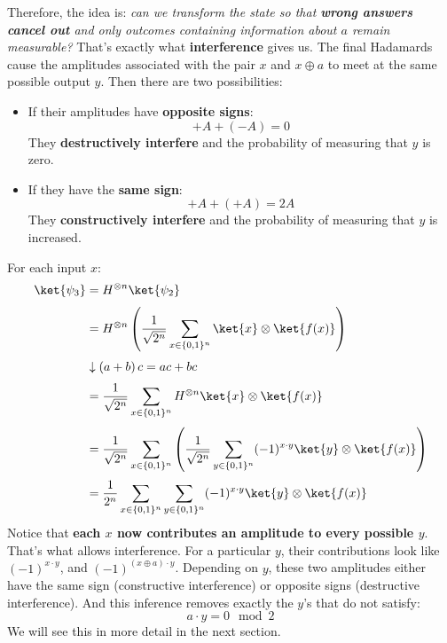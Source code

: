 \highspace
Therefore, the idea is: \emph{can we transform the state so that \textbf{wrong answers cancel out} and only outcomes containing information about $a$ remain measurable?} That's exactly what \textbf{interference} gives us. The final Hadamards cause the amplitudes associated with the pair $x$ and $x \oplus a$ to meet at the same possible output $y$. Then there are two possibilities:
\begin{itemize}
    \item[\textcolor{Red2}{\faIcon{times}}] If their amplitudes have \textbf{opposite signs}:
        \begin{equation*}
            + A + (-A) = 0
        \end{equation*}
        They \textbf{destructively interfere} and the probability of measuring that $y$ is zero.

    \item[\textcolor{Green2}{\faIcon{check}}] If they have the \textbf{same sign}:
        \begin{equation*}
            + A + (+A) = 2A
        \end{equation*}
        They \textbf{constructively interfere} and the probability of measuring that $y$ is increased.
\end{itemize}
For each input $x$:
\begin{align*}
    \ket{\psi_3} &= H^{\otimes n} \ket{\psi_2} \\[.3em]
    &= H^{\otimes n} \left( \frac{1}{\sqrt{2^n}} \sum_{x \in \{0,1\}^n} \ket{x} \otimes \ket{f(x)} \right) \\[.3em]
    &\downarrow \left(a +b\right) c = ac + bc \\[.3em]
    &= \frac{1}{\sqrt{2^n}} \sum_{x \in \{0,1\}^n} H^{\otimes n} \ket{x} \otimes \ket{f(x)} \\[.3em]
    &= \frac{1}{\sqrt{2^n}} \sum_{x \in \{0,1\}^n} \left( \frac{1}{\sqrt{2^n}} \sum_{y \in \{0,1\}^n} (-1)^{x \cdot y} \ket{y} \otimes \ket{f(x)} \right) \\[.3em]
    &= \frac{1}{2^n} \sum_{x \in \{0,1\}^n} \sum_{y \in \{0,1\}^n} (-1)^{x \cdot y} \ket{y} \otimes \ket{f(x)}
\end{align*}
Notice that \textbf{each $x$ now contributes an amplitude to every possible $y$}. That's what allows interference. For a particular $y$, their contributions look like $(-1)^{x \cdot y}$, and $(-1)^{(x \oplus a) \cdot y}$. Depending on $y$, these two amplitudes either have the same sign (constructive interference) or opposite signs (destructive interference). And this inference removes exactly the $y$'s that do not satisfy:
\begin{equation*}
    a \cdot y = 0 \mod 2
\end{equation*}
We will see this in more detail in the next section.

